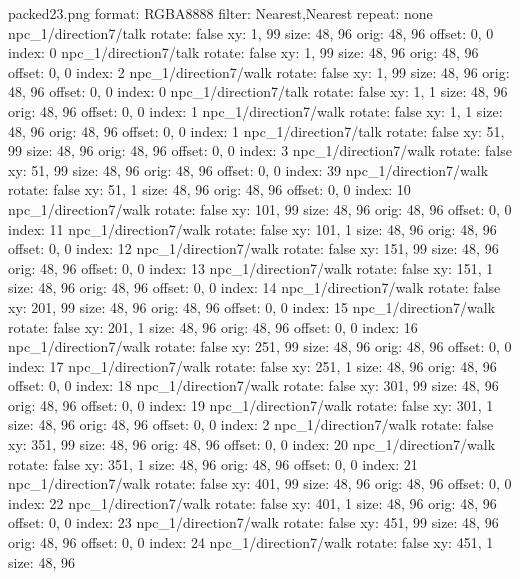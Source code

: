 packed23.png
format: RGBA8888
filter: Nearest,Nearest
repeat: none
npc_1/direction7/talk
  rotate: false
  xy: 1, 99
  size: 48, 96
  orig: 48, 96
  offset: 0, 0
  index: 0
npc_1/direction7/talk
  rotate: false
  xy: 1, 99
  size: 48, 96
  orig: 48, 96
  offset: 0, 0
  index: 2
npc_1/direction7/walk
  rotate: false
  xy: 1, 99
  size: 48, 96
  orig: 48, 96
  offset: 0, 0
  index: 0
npc_1/direction7/talk
  rotate: false
  xy: 1, 1
  size: 48, 96
  orig: 48, 96
  offset: 0, 0
  index: 1
npc_1/direction7/walk
  rotate: false
  xy: 1, 1
  size: 48, 96
  orig: 48, 96
  offset: 0, 0
  index: 1
npc_1/direction7/talk
  rotate: false
  xy: 51, 99
  size: 48, 96
  orig: 48, 96
  offset: 0, 0
  index: 3
npc_1/direction7/walk
  rotate: false
  xy: 51, 99
  size: 48, 96
  orig: 48, 96
  offset: 0, 0
  index: 39
npc_1/direction7/walk
  rotate: false
  xy: 51, 1
  size: 48, 96
  orig: 48, 96
  offset: 0, 0
  index: 10
npc_1/direction7/walk
  rotate: false
  xy: 101, 99
  size: 48, 96
  orig: 48, 96
  offset: 0, 0
  index: 11
npc_1/direction7/walk
  rotate: false
  xy: 101, 1
  size: 48, 96
  orig: 48, 96
  offset: 0, 0
  index: 12
npc_1/direction7/walk
  rotate: false
  xy: 151, 99
  size: 48, 96
  orig: 48, 96
  offset: 0, 0
  index: 13
npc_1/direction7/walk
  rotate: false
  xy: 151, 1
  size: 48, 96
  orig: 48, 96
  offset: 0, 0
  index: 14
npc_1/direction7/walk
  rotate: false
  xy: 201, 99
  size: 48, 96
  orig: 48, 96
  offset: 0, 0
  index: 15
npc_1/direction7/walk
  rotate: false
  xy: 201, 1
  size: 48, 96
  orig: 48, 96
  offset: 0, 0
  index: 16
npc_1/direction7/walk
  rotate: false
  xy: 251, 99
  size: 48, 96
  orig: 48, 96
  offset: 0, 0
  index: 17
npc_1/direction7/walk
  rotate: false
  xy: 251, 1
  size: 48, 96
  orig: 48, 96
  offset: 0, 0
  index: 18
npc_1/direction7/walk
  rotate: false
  xy: 301, 99
  size: 48, 96
  orig: 48, 96
  offset: 0, 0
  index: 19
npc_1/direction7/walk
  rotate: false
  xy: 301, 1
  size: 48, 96
  orig: 48, 96
  offset: 0, 0
  index: 2
npc_1/direction7/walk
  rotate: false
  xy: 351, 99
  size: 48, 96
  orig: 48, 96
  offset: 0, 0
  index: 20
npc_1/direction7/walk
  rotate: false
  xy: 351, 1
  size: 48, 96
  orig: 48, 96
  offset: 0, 0
  index: 21
npc_1/direction7/walk
  rotate: false
  xy: 401, 99
  size: 48, 96
  orig: 48, 96
  offset: 0, 0
  index: 22
npc_1/direction7/walk
  rotate: false
  xy: 401, 1
  size: 48, 96
  orig: 48, 96
  offset: 0, 0
  index: 23
npc_1/direction7/walk
  rotate: false
  xy: 451, 99
  size: 48, 96
  orig: 48, 96
  offset: 0, 0
  index: 24
npc_1/direction7/walk
  rotate: false
  xy: 451, 1
  size: 48, 96
